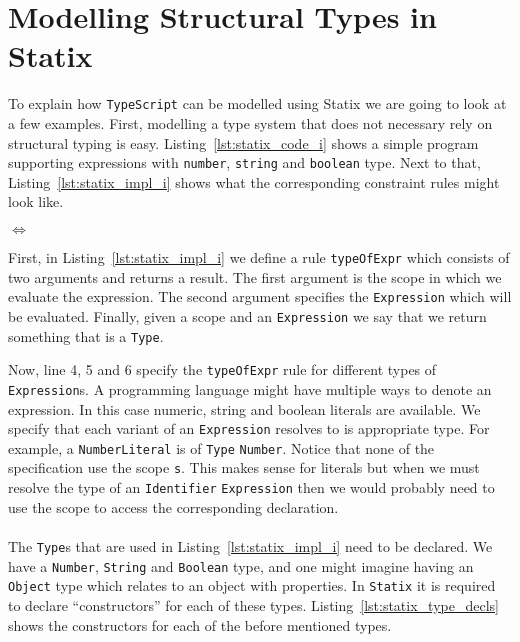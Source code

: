 \documentclass{article}
\newcommand{\ttt}[1]{\texttt{#1}}
\begin{document}
\section*{Modelling Structural Types in Statix}
To explain how \ttt{TypeScript} can be modelled using Statix we are going to look at a few examples.
First, modelling a type system that does not necessary rely on structural typing is easy.
Listing~\ref{lst:statix_code_i} shows a simple program supporting expressions with \ttt{number}, \ttt{string} and \ttt{boolean} type.
Next to that, Listing~\ref{lst:statix_impl_i} shows what the corresponding constraint rules might look like.

\noindent
\begin{minipage}{.29\textwidth}

\end{minipage}
\hfill$\Longleftrightarrow$\hfill\hfill\hfill
\begin{minipage}{.61\textwidth}

\end{minipage}
First, in Listing~\ref{lst:statix_impl_i} we define a rule \ttt{typeOfExpr} which consists of two arguments and returns a result.
The first argument is the scope in which we evaluate the expression.
The second argument specifies the \ttt{Expression} which will be evaluated.
Finally, given a scope and an \ttt{Expression} we say that we return something that is a \ttt{Type}.

Now, line 4, 5 and 6 specify the \ttt{typeOfExpr} rule for different types of \ttt{Expression}s.
A programming language might have multiple ways to denote an expression.
In this case numeric, string and boolean literals are available.
We specify that each variant of an \ttt{Expression} resolves to is appropriate type.
For example, a \ttt{NumberLiteral} is of \ttt{Type} \ttt{Number}.
Notice that none of the specification use the scope \ttt{s}.
This makes sense for literals but when we must resolve the type of an \ttt{Identifier} \ttt{Expression} then we would probably need to use the scope to access the corresponding declaration.
\\\\
The \ttt{Type}s that are used in Listing~\ref{lst:statix_impl_i} need to be declared.
We have a \ttt{Number}, \ttt{String} and \ttt{Boolean} type, and one might imagine having an \ttt{Object} type which relates to an object with properties.
In \ttt{Statix} it is required to declare ``constructors'' for each of these types.
Listing~\ref{lst:statix_type_decls} shows the constructors for each of the before mentioned types.
\end{document}
